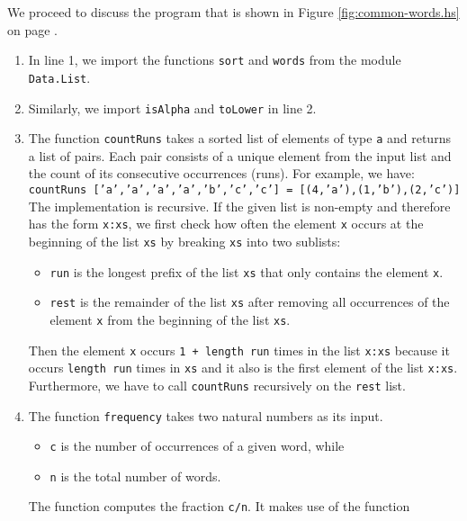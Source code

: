 We proceed to discuss the program that is shown in Figure \ref{fig:common-words.hs} on page
\pageref{fig:common-words.hs}. 
\begin{enumerate}
\item In line 1, we import the functions \texttt{sort} and \texttt{words} from the module \texttt{Data.List}. 
\item Similarly, we import \texttt{isAlpha} and \texttt{toLower} in line 2.
\item The function \texttt{countRuns} takes a sorted list of elements of type \texttt{a}
      and returns a list of pairs.  Each pair consists of a unique element from the input list
      and the count of its consecutive occurrences (runs).
      For example, we have:
      \\[0.2cm]
      \hspace*{0.8cm}
      \texttt{countRuns ['a','a','a','a','b','c','c'] = [(4,'a'),(1,'b'),(2,'c')]}
      \\[0.2cm]
      The implementation is recursive.  If the given list is non-empty and therefore has the form
      \texttt{x:xs}, we first check how often the element \texttt{x} occurs at the beginning of the list
      \texttt{xs} by breaking \texttt{xs} into two sublists:
      \begin{itemize}
      \item \texttt{run} is the longest prefix of the list \texttt{xs} that only contains the element
            \texttt{x}.
      \item \texttt{rest} is the remainder of the list \texttt{xs} after removing all occurrences of the
            element \texttt{x} from the beginning of the list \texttt{xs}.    
      \end{itemize}
      Then the element \texttt{x} occurs \texttt{1 + length run} times in the list \texttt{x:xs} because it
      occurs \texttt{length run} times in \texttt{xs} and it also is the first element of the list \texttt{x:xs}.
      Furthermore, we have to call \texttt{countRuns} recursively on the \texttt{rest} list.
\item The function \texttt{frequency} takes two natural numbers as its input.
      \begin{itemize}
      \item \texttt{c} is the number of occurrences of a given word, while
      \item \texttt{n} is the total number of words.
      \end{itemize}
      The function computes the fraction \texttt{c/n}.  It makes use of the function

\end{enumerate}
